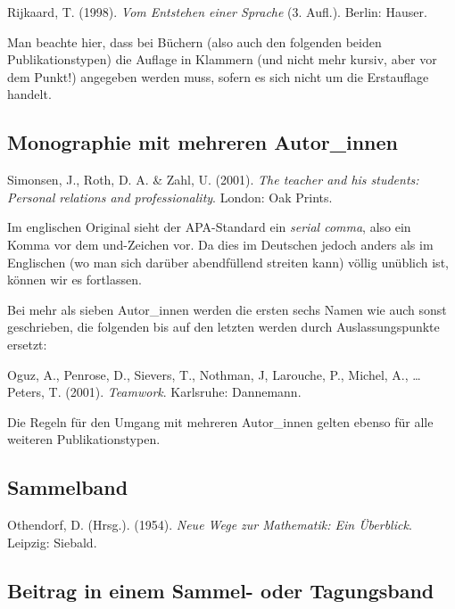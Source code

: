 \documentclass[ngerman,bibliography=totoc,oneside,12pt,a4paper]{scrbook}
\begin{document}
Rijkaard, T. (1998). \emph{Vom Entstehen einer
Sprache} (3. Aufl.). Berlin: Hauser.

Man beachte hier, dass bei Büchern (also auch den folgenden beiden
Publikationstypen) die Auflage in Klammern (und nicht mehr kursiv, aber
vor dem Punkt!) angegeben werden muss, sofern es sich nicht um die
Erstauflage handelt.

\subsection*{Monographie mit mehreren
Autor\_innen}\label{monographie-mit-mehreren-autor_innen}

Simonsen, J., Roth, D. A. \& Zahl, U. (2001).
\emph{The teacher and his students: Personal relations and
professionality}. London: Oak Prints.

Im englischen Original sieht der APA-Standard ein \emph{serial comma},
also ein Komma vor dem und-Zeichen vor. Da dies im Deutschen jedoch
anders als im Englischen (wo man sich darüber abendfüllend streiten
kann) völlig unüblich ist, können wir es fortlassen.

Bei mehr als sieben Autor\_innen werden die ersten sechs Namen wie auch
sonst geschrieben, die folgenden bis auf den letzten werden durch
Auslassungspunkte ersetzt:

Oguz, A., Penrose, D., Sievers, T., Nothman, J,
Larouche, P., Michel, A., \ldots{} Peters, T. (2001). \emph{Teamwork}.
Karlsruhe: Dannemann.

Die Regeln für den Umgang mit mehreren Autor\_innen gelten ebenso für
alle weiteren Publikationstypen.

\subsection*{Sammelband}\label{sammelband}

Othendorf, D. (Hrsg.). (1954). \emph{Neue Wege zur
Mathematik: Ein Überblick}. Leipzig: Siebald.

\subsection*{Beitrag in einem Sammel- oder
Tagungsband}\label{beitrag-in-einem-sammel--oder-tagungsband}
\end{document}
